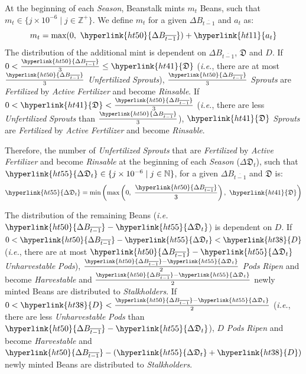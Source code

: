 \documentclass[tikz]{article}
\newcommand{\term}[1]{\textsl{#1}}
\begin{document}
At the beginning of each \term{Season}, Beanstalk mints $m_t$ Beans, such that $m_t \in \{j \times 10^{-6} \mid j \in \mathbb{Z}^{+} \}$.
We define $m_t$ for a given \hyperlink{ht50}{$\Delta B_{\overline{t-1}}$} and \hyperlink{ht11}{$a_t$} as:
$$m_t = \text{max}(0,\ \hyperlink{ht50}{\Delta B_{\overline{t-1}}}) + \hyperlink{ht11}{a_t}$$
The distribution of the additional mint is dependent on \hyperlink{ht50}{$\Delta B_{\overline{t-1}}$}, \hyperlink{ht41}{$\mathfrak{D}$} and \hyperlink{ht38}{$D$}. If $0 < \frac{\hyperlink{ht50}{\Delta B_{\overline{t-1}}}}{3} \leq \hyperlink{ht41}{\mathfrak{D}}$ (\term{i.e.}, there are at most $\frac{\hyperlink{ht50}{\Delta B_{\overline{t-1}}}}{3}$ \term{Unfertilized} \term{Sprouts}), $\frac{\hyperlink{ht50}{\Delta B_{\overline{t-1}}}}{3}$ \term{Sprouts} are \term{Fertilized} by \term{Active} \term{Fertilizer} and become \term{Rinsable}. If $0 < \hyperlink{ht41}{\mathfrak{D}} < \frac{\hyperlink{ht50}{\Delta B_{\overline{t-1}}}}{3}$ (\term{i.e.}, there are less \term{Unfertilized} \term{Sprouts} than $\frac{\hyperlink{ht50}{\Delta B_{\overline{t-1}}}}{3}$), $\hyperlink{ht41}{\mathfrak{D}}$ \term{Sprouts} are \term{Fertilized} by \term{Active} \term{Fertilizer} and become \term{Rinsable}.

Therefore, the number of \term{Unfertilized} \term{Sprouts} that are \term{Fertilized} by \term{Active} \term{Fertilizer} and become \term{Rinsable} at the beginning of each \term{Season} (\hyperlink{ht55}{$\Delta \mathfrak{D}_t$}), such that $\hyperlink{ht55}{\Delta \mathfrak{D}_t} \in \{j \times 10^{-6} \mid j \in \mathbb{N} \}$, for a given \hyperlink{ht50}{$\Delta B_{\overline{t-1}}$} and \hyperlink{ht41}{$\mathfrak{D}$} is:
$$\hyperlink{ht55}{\Delta \mathfrak{D}_t} = \text{min}\left(\text{max}\left(0,\ \frac{\hyperlink{ht50}{\Delta B_{\overline{t-1}}}}{3}\right),\ \hyperlink{ht41}{\mathfrak{D}}\right)$$

\newpage
The distribution of the remaining Beans (\term{i.e. $\hyperlink{ht50}{\Delta B_{\overline{t-1}}} - \hyperlink{ht55}{\Delta \mathfrak{D}_t}$}) is dependent on \hyperlink{ht38}{$D$}. If $0 < \hyperlink{ht50}{\Delta B_{\overline{t-1}}} - \hyperlink{ht55}{\Delta \mathfrak{D}_t} < \hyperlink{ht38}{D}$ (\term{i.e.}, there are at most $\hyperlink{ht50}{\Delta B_{\overline{t-1}}} - \hyperlink{ht55}{\Delta \mathfrak{D}_t}$ \term{Unharvestable} \term{Pods}), $\frac{\hyperlink{ht50}{\Delta B_{\overline{t-1}}} - \hyperlink{ht55}{\Delta \mathfrak{D}_t}}{2}$ \term{Pods} \term{Ripen} and become \term{Harvestable} and $\frac{\hyperlink{ht50}{\Delta B_{\overline{t-1}}} - \hyperlink{ht55}{\Delta \mathfrak{D}_t}}{2}$ newly minted Beans are distributed to \term{Stalkholders}. If $0 < \hyperlink{ht38}{D} < \frac{\hyperlink{ht50}{\Delta B_{\overline{t-1}}} - \hyperlink{ht55}{\Delta \mathfrak{D}_t}}{2}$ (\term{i.e.}, there are less \term{Unharvestable} \term{Pods} than $\hyperlink{ht50}{\Delta B_{\overline{t-1}}} - \hyperlink{ht55}{\Delta \mathfrak{D}_t}$), \hyperlink{ht38}{$D$} \term{Pods} \term{Ripen} and become \term{Harvestable} and $\hyperlink{ht50}{\Delta B_{\overline{t-1}}} - (\hyperlink{ht55}{\Delta \mathfrak{D}_t} + \hyperlink{ht38}{D})$ newly minted Beans are distributed to \term{Stalkholders}.
\end{document}
